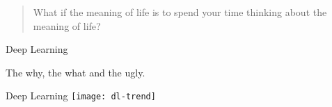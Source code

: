 

\begin{frame}
  \begin{quote}
    What if the meaning of life is to spend your time thinking about the meaning of life?
  \end{quote}
\end{frame}

\begin{frame}
  \centering
  {
    \Huge
    \color{orange}
    Deep Learning
    \vspace{0.5cm}
  }

  {
  \Large
  \pause The why\pause, the what\pause{} and the ugly.
  }
\end{frame}

\begin{slide}{Deep Learning}
  \texttt{[image: dl-trend]}
\end{slide}

